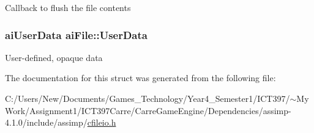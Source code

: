 Callback to flush the file contents \hypertarget{structai_file_ec528fa18f4755fe4f28d604fde28aad}{
\subsubsection[UserData]{\setlength{\rightskip}{0pt plus 5cm}aiUserData {\bf aiFile::UserData}}}
\label{structai_file_ec528fa18f4755fe4f28d604fde28aad}


User-defined, opaque data 

The documentation for this struct was generated from the following file:\begin{CompactItemize}
\item 
C:/Users/New/Documents/Games\_\-Technology/Year4\_\-Semester1/ICT397/$\sim$My Work/Assignment1/ICT397Carre/CarreGameEngine/Dependencies/assimp-4.1.0/include/assimp/\hyperlink{cfileio_8h}{cfileio.h}\end{CompactItemize}
